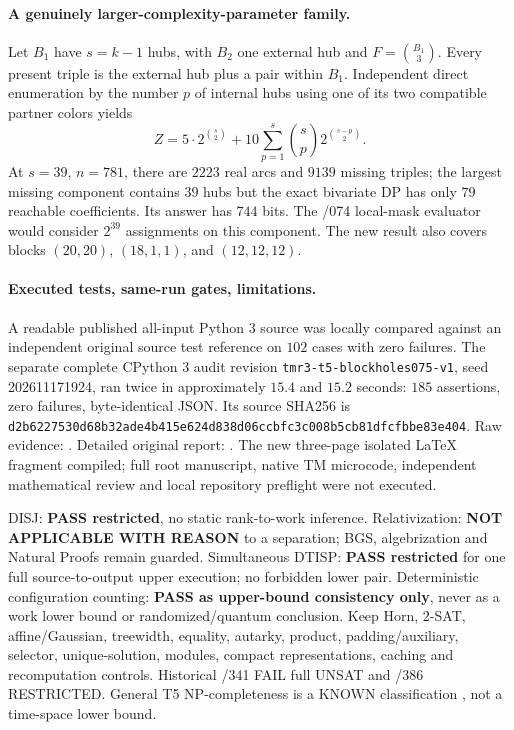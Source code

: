 \documentclass[11pt]{article}
\begin{document}
\paragraph{A genuinely larger-complexity-parameter family.}
Let $B_1$ have $s=k-1$ hubs, with $B_2$ one external
hub and $F=\binom{B_1}{3}$. Every present triple is the
external hub plus a pair within $B_1$. Independent
direct enumeration by the number $p$ of internal hubs
using one of its two compatible partner colors yields
\[
 \boxed{\displaystyle
 Z=5\cdot2^{\binom s2}
   +10\sum_{p=1}^{s}\binom sp
       2^{\binom{s-p}2}.}
\]
At $s=39$, $n=781$, there are $2223$ real arcs and
$9139$ missing triples; the largest missing component
contains $39$ hubs but the exact bivariate DP has
only $79$ reachable coefficients. Its answer has
$744$ bits. The /074 local-mask evaluator would consider
$2^{39}$ assignments on this component. The new result
also covers blocks $(20,20)$, $(18,1,1)$, and
$(12,12,12)$.

\paragraph{Executed tests, same-run gates, limitations.}
A readable published all-input Python 3 source
was locally compared against an independent original
source test reference on $102$ cases with zero failures.
The separate complete CPython 3 audit revision
\texttt{tmr3-t5-blockholes075-v1}, seed 202611171924,
ran twice in approximately $15.4$ and $15.2$ seconds:
$185$ assertions, zero failures, byte-identical JSON.
Its source SHA256 is
\texttt{d2b6227530d68b32ade4b415e624d838d06ccbfc3c008b5cb81dfcfbbe83e404}.
Raw evidence:
.
Detailed original report:
.
The new three-page isolated LaTeX fragment compiled;
full root manuscript, native TM microcode, independent
mathematical review and local repository preflight were
not executed.

DISJ: \textbf{PASS restricted}, no static rank-to-work
inference. Relativization: \textbf{NOT APPLICABLE WITH
REASON} to a separation; BGS, algebrization and
Natural Proofs remain guarded. Simultaneous DTISP:
\textbf{PASS restricted} for one full source-to-output
upper execution; no forbidden lower pair.
Deterministic configuration counting: \textbf{PASS
as upper-bound consistency only}, never as a
work lower bound or randomized/quantum conclusion.
Keep Horn, 2-SAT, affine/Gaussian, treewidth,
equality, autarky, product, padding/auxiliary,
selector, unique-solution, modules, compact
representations, caching and recomputation controls.
Historical /341 FAIL full UNSAT and /386 RESTRICTED.
General T5 NP-completeness is a KNOWN classification
\cite{BangJensenHellMacGillivray1988}, not a
time-space lower bound.
\end{document}
